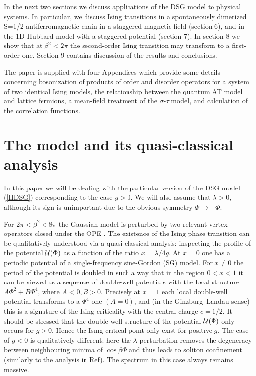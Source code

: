 In the next two
sections we discuss applications of the DSG
model to physical systems. In particular, we discuss Ising transitions
in a spontaneously dimerized S=1/2 antiferromagnetic chain in a staggered
magnetic field (section 6), and in the 1D Hubbard model with a staggered
potential (section 7).
In section 8 we show that at $\beta^2 < 2\pi$ the second-order Ising transition
may transform to a first-order one. Section 9 contains discussion of the
results and conclusions.

The paper is supplied with four Appendices which provide some details
concerning
bosonization of products of order and disorder operators for a system of two
identical Ising models, the relationship between the quantum AT model and
lattice fermions, a mean-field treatment of the $\sigma$-$\tau$ model,
and calculation of the correlation functions.

\section{The model and its quasi-classical analysis}

In this paper we will be dealing with
the particular version of the DSG model (\ref{HDSG})
corresponding to the case $g >0$. 
We will also assume that $\lambda > 0$, although its
sign is unimportant due to the obvious symmetry $\Phi \to -\Phi$.

For $2\pi< \beta^2 < 8\pi$ the Gaussian model is perturbed by
two relevant vertex operators closed under the OPE \cite{DM}.
The existence of the Ising phase transition
can be qualitatively understood via
a quasi-classical analysis: inspecting the profile
of the potential ${\cal{U}} (\Phi)$ as a function of the ratio $x=\lambda/4g$.
At $x = 0$ one has a
periodic potential of a single-frequency sine-Gordon (SG) model.
For $x \neq 0$ the period of the potential is doubled in such a way that
in the region $0 < x < 1$
it can be viewed as a sequence of double-well potentials
with the local structure $A \Phi^2 + B \Phi^4$, where $A<0, B>0$.
Precisely at $x=1$ each local double-well
potential transforms to a $\Phi^4$ one
$(A=0)$, and (in the Ginzburg--Landau sense)
this is a signature of the Ising criticality
with the central charge $c=1/2$.
It should be stressed that the double-well structure of the potential
${\cal{U}}(\Phi)$ only occurs for $g > 0$.
Hence the Ising critical point only exist for
positive $g$. The case of $g < 0$ is qualitatively different:
here the $\lambda$-perturbation removes the degeneracy between neighbouring
minima of $\cos\beta\Phi$ and thus leads to soliton
confinement (similarly to the analysis in Ref\cite{aff-conf}).
The spectrum in this case always remains massive.

